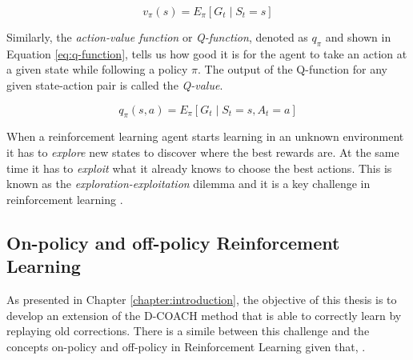 \begin{equation}
v_\pi \left(s\right) = E_\pi \left[G_{t}\mid S_{t}=s\right]
\label{eq:value-function}
\end{equation}



Similarly, the \textit{action-value function} or \textit{Q-function}, denoted as $q_\pi$ and shown in Equation \eqref{eq:q-function}, tells us how good it is for the agent to take an action at a given state while following a policy $\pi$. The output of the Q-function for any given state-action pair is called the \textit{Q-value}. 

\begin{equation}
q_\pi \left( s,a \right) = E_\pi \left[ G_{t}\mid S_{t}=s,A_{t}=a \right] 
\label{eq:q-function}
\end{equation}




When a reinforcement learning agent starts learning in an unknown environment it has to \textit{explore} new states to discover where the best rewards are. At the same time it has to \textit{exploit} what it already knows to choose the best actions. This is known as the \textit{exploration-exploitation }dilemma and it is a key challenge in reinforcement learning \cite{Sutton:1998}.




\subsection{On-policy and off-policy Reinforcement Learning}
\label{subsection:on and off-policy Reinforcement Learning}

As presented in Chapter \ref{chapter:introduction}, the objective of this thesis is to develop an extension of the D-COACH method that is able to correctly learn by replaying old corrections. There is a simile between this challenge and the concepts on-policy and off-policy in Reinforcement Learning given that,  \cite{Atari-RL} .


